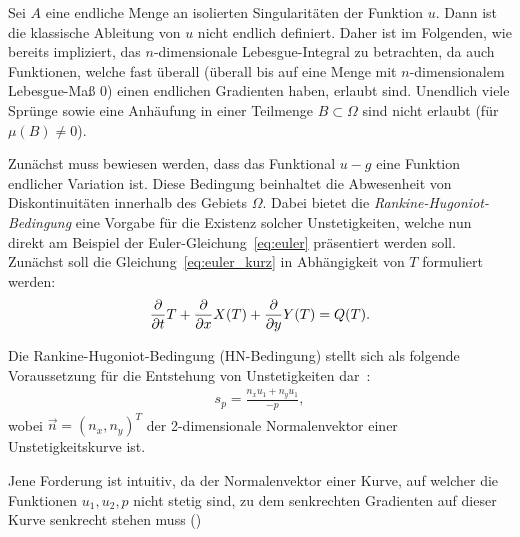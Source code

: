 \begin{Anmerkung}
    Sei $A$ eine endliche Menge an isolierten Singularitäten der Funktion $u$. Dann ist die klassische Ableitung von $u$ nicht endlich definiert. Daher ist im Folgenden, wie bereits impliziert, das $n$-dimensionale Lebesgue-Integral zu betrachten, da auch Funktionen, welche fast überall (überall bis auf eine Menge mit $n$-dimensionalem Lebesgue-Maß 0) einen endlichen Gradienten haben, erlaubt sind. Unendlich viele Sprünge sowie eine Anhäufung in einer Teilmenge $B\subset \Omega$ sind nicht erlaubt (für $\mu(B)\neq 0$).
\end{Anmerkung}
Zunächst muss bewiesen werden, dass das Funktional $u-g$ eine Funktion endlicher Variation ist. Diese Bedingung beinhaltet die Abwesenheit von Diskontinuitäten innerhalb des Gebiets $\Omega$. Dabei bietet die \emph{Rankine-Hugoniot-Bedingung} eine Vorgabe für die Existenz solcher Unstetigkeiten, welche nun direkt am Beispiel der Euler-Gleichung~\eqref{eq:euler} präsentiert werden soll.
Zunächst soll die Gleichung~\eqref{eq:euler_kurz} in Abhängigkeit von $T$ formuliert werden:
\begin{align*}
    \frac{\partial }{\partial t}T + \frac{\partial }{\partial x}X(T) + \frac{\partial }{\partial y}Y(T) = Q(T).
\end{align*}

\begin{Definitionbox}
    Die Rankine-Hugoniot-Bedingung (HN-Bedingung) stellt sich als folgende Voraussetzung für die Entstehung von Unstetigkeiten dar~\cite[Vgl.][S. 18]{vides_simple_2014}:
    \begin{align}
    \label{eq:HN_bedingung}
        s_p = \frac{n_x u_1 + n_y u_1}{-p},
    \end{align}
    wobei $\vec{n} = (n_x, n_y)^T$ der 2-dimensionale Normalenvektor einer Unstetigkeitskurve ist.
\end{Definitionbox}
Jene Forderung ist intuitiv, da der Normalenvektor einer Kurve, auf welcher die Funktionen $u_1 , u_2 , p$ nicht stetig sind, zu dem senkrechten Gradienten auf dieser Kurve senkrecht stehen muss ()
